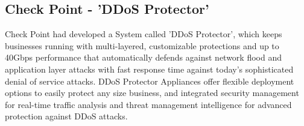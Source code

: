 \documentclass{report}
\begin{document}
\subsection {Check Point -  'DDoS Protector'}
Check Point had developed a System called 'DDoS Protector', which keeps businesses running with multi-layered, customizable protections and up to 40Gbps performance that automatically defends against network flood and application layer attacks with fast response time against today’s sophisticated denial of service attacks.
\hfill \break
DDoS Protector Appliances offer flexible deployment options to easily protect any size business, and integrated security management for real-time traffic analysis and threat management intelligence for advanced protection against DDoS attacks.
  \hfill {}
  \hfill \break
\end{document}

